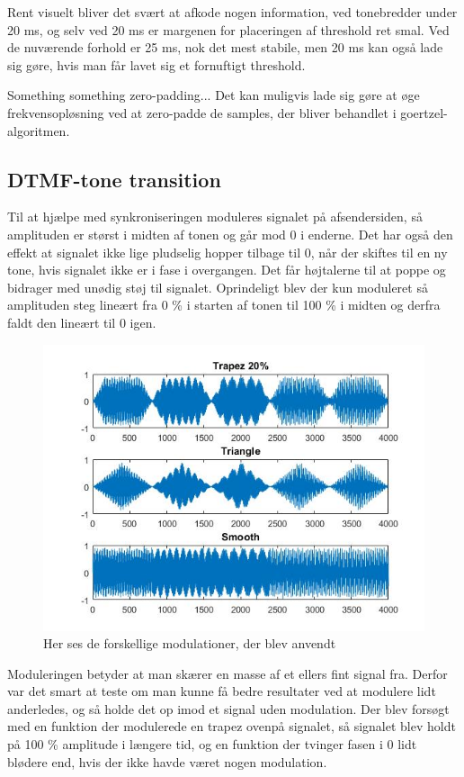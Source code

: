 Rent visuelt bliver det svært at afkode nogen information, ved tonebredder under 20 ms, og selv ved 20 ms er margenen for placeringen af threshold ret smal. Ved de nuværende forhold er 25 ms, nok det mest stabile, men 20 ms kan også lade sig gøre, hvis man får lavet sig et fornuftigt threshold.

Something something zero-padding... Det kan muligvis lade sig gøre at øge frekvensopløsning ved at zero-padde de samples, der bliver behandlet i goertzel-algoritmen.

\subsection{DTMF-tone transition}

Til at hjælpe med synkroniseringen moduleres signalet på afsendersiden, så amplituden er størst i midten af tonen og går mod 0 i enderne. Det har også den effekt at signalet ikke lige pludselig hopper tilbage til 0, når der skiftes til en ny tone, hvis signalet ikke er i fase i overgangen. Det får højtalerne til at poppe og bidrager med unødig støj til signalet. Oprindeligt blev der kun moduleret så amplituden steg lineært fra 0 \% i starten af tonen til 100 \% i midten og derfra faldt den lineært til 0 igen. 

\begin{figure}[ht]
\centering
\includegraphics[scale=0.6]{Billeder/Modulation.PNG}
\caption{Her ses de forskellige modulationer, der blev anvendt}
\label{fig:snap}
\end{figure} 

Moduleringen betyder at man skærer en masse af et ellers fint signal fra. Derfor var det smart at teste om man kunne få bedre resultater ved at modulere lidt anderledes, og så holde det op imod et signal uden modulation. Der blev forsøgt med en funktion der modulerede en trapez ovenpå signalet, så signalet blev holdt på 100 \% amplitude i længere tid, og en funktion der tvinger fasen i 0 lidt blødere end, hvis der ikke havde været nogen modulation. 

